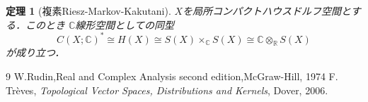 \documentclass[leqno]{jsarticle}
\newtheorem{thm}{定理}
\newcommand{\rr}{\mathbb{R}}
\newcommand{\cc}{\mathbb{C}}
\begin{document}
\begin{thm}[複素Riesz-Markov-Kakutani]
$X$を局所コンパクトハウスドルフ空間とする．このとき
$\cc$線形空間としての同型
\[
C(X; \cc)^*\cong H(X)\cong S(X)\times_{\cc}S(X)\cong\cc\otimes_{\rr}S(X)
\]
が成り立つ．
\end{thm}



\begin{thebibliography}{9}
W.Rudin,Real and Complex Analysis second edition,McGraw-Hill, 1974
F. Tr\`eves, \textit{Topological Vector Spaces, Distributions and Kernels}, Dover, 2006. 
\end{thebibliography}




			
\end{document}
